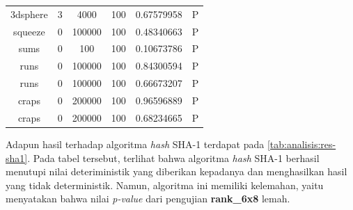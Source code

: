 \documentclass[conference]{IEEEtran}
\newcommand{\en}[1]
    {\foreignlanguage{english}{\textit{#1}}}
\begin{document}
\begin{table}[htbp]
\begin{center}
\begin{tabular}{|c|c|c|c|c|c|}
            3dsphere       & 3            & 4000         & 100          & 0.67579958            & P              \\
            squeeze        & 0            & 100000       & 100          & 0.48340663            & P              \\
            sums           & 0            & 100          & 100          & 0.10673786            & P              \\
            runs           & 0            & 100000       & 100          & 0.84300594            & P              \\
            runs           & 0            & 100000       & 100          & 0.66673207            & P              \\
            craps          & 0            & 200000       & 100          & 0.96596889            & P              \\
            craps          & 0            & 200000       & 100          & 0.68234665            & P              \\
            \hline
        \end{tabular}
    \end{center}
\end{table}

Adapun hasil  terhadap algoritma \en{hash} SHA-1 terdapat pada \autoref{tab:analisis:res-sha1}.
Pada tabel tersebut, terlihat bahwa algoritma \en{hash} SHA-1 berhasil menutupi nilai deteriministik yang diberikan kepadanya dan menghasilkan hasil yang tidak deterministik. Namun, algoritma ini memiliki kelemahan, yaitu  menyatakan bahwa nilai \en{p-value} dari pengujian \textbf{rank\_6x8} lemah.
\end{document}

